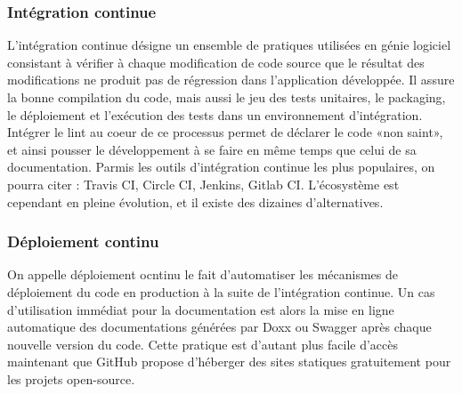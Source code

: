     \subsubsection{Intégration continue}
        L'intégration continue désigne un ensemble de pratiques utilisées en génie logiciel consistant
        à vérifier à chaque modification de code source que le résultat des modifications ne produit
        pas de régression dans l'application développée. Il assure la bonne compilation du code,
        mais aussi le jeu des tests unitaires, le packaging, le déploiement et l’exécution des tests
        dans un environnement d’intégration. Intégrer le lint au coeur de ce processus permet
        de déclarer le code «non saint», et ainsi pousser le développement à se faire en même
        temps que celui de sa documentation. Parmis les outils d'intégration continue les plus
        populaires, on pourra citer : Travis CI, Circle CI, Jenkins, Gitlab CI. L'écosystème est cependant
        en pleine évolution, et il existe des dizaines d'alternatives.

    \subsubsection{Déploiement continu}
        On appelle déploiement ocntinu le fait d'automatiser les mécanismes de déploiement du code en
        production à la suite de l'intégration continue. Un cas d'utilisation immédiat pour la documentation
        est alors la mise en ligne automatique des documentations générées par Doxx ou Swagger après
        chaque nouvelle version du code. Cette pratique est d'autant plus facile d'accès maintenant que
        GitHub propose d'héberger des sites statiques gratuitement pour les projets open-source. 